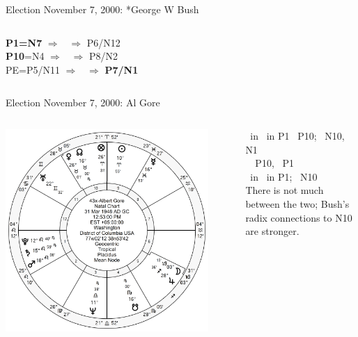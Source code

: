 \begin{frame}[t]{Election November 7, 2000: *George W Bush}
\begin{columns}[T, onlytextwidth]
\textbf{\dgreen P1=N7}
	$\Rightarrow$ \Saturn\, $\Rightarrow$ P6/N12\\
\textbf{\red P10}=N4
	$\Rightarrow$ \Mars\, $\Rightarrow$ P8/N2\\
PE=P5/N11
	 $\Rightarrow$ \Mercury\, $\Rightarrow$ \textbf{\dgreen P7/N1}

\end{columns}
\end{frame}

\begin{frame}[t]{Election November 7, 2000: Al Gore}
\small
\begin{columns}[T, onlytextwidth]
\vspace{-1em}
{\includegraphics[width=0.9\textwidth]{charts/Gore.png}}
\fontsize{8pt}{9pt}\selectfont

\Jupiter\, in \Sagittarius\, in P1 \Square\, P10; \Trine\, N10, \Trine\, N1 \\
\Mercury\, \Opposition\, P10, \Square\, P1 \\
\Moon\, in \Capricorn\, in P1; \Square\, N10 \\
\vspace{0.5em}
There is not much between the two; Bush's radix connections to N10 are stronger.


\end{columns}
\end{frame}

